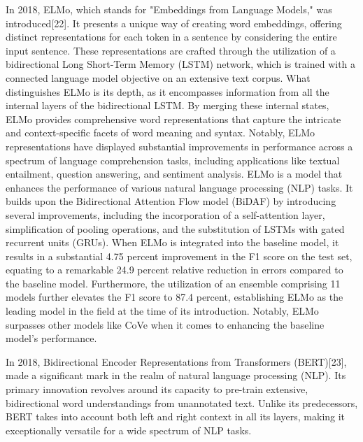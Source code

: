 \documentclass[fleqn,10pt]{thescipub} %
\begin{document}
In 2018, ELMo, which stands for "Embeddings from Language Models," was introduced[22]. It presents a unique way of creating word embeddings, offering distinct representations for each token in a sentence by considering the entire input sentence. These representations are crafted through the utilization of a bidirectional Long Short-Term Memory (LSTM) network, which is trained with a connected language model objective on an extensive text corpus. What distinguishes ELMo is its depth, as it encompasses information from all the internal layers of the bidirectional LSTM. By merging these internal states, ELMo provides comprehensive word representations that capture the intricate and context-specific facets of word meaning and syntax. Notably, ELMo representations have displayed substantial improvements in performance across a spectrum of language comprehension tasks, including applications like textual entailment, question answering, and sentiment analysis.
ELMo is a model that enhances the performance of various natural language processing (NLP) tasks. It builds upon the Bidirectional Attention Flow model (BiDAF) by introducing several improvements, including the incorporation of a self-attention layer, simplification of pooling operations, and the substitution of LSTMs with gated recurrent units (GRUs). When ELMo is integrated into the baseline model, it results in a substantial 4.75 percent improvement in the F1 score on the test set, equating to a remarkable 24.9 percent relative reduction in errors compared to the baseline model. Furthermore, the utilization of an ensemble comprising 11 models further elevates the F1 score to 87.4 percent, establishing ELMo as the leading model in the field at the time of its introduction. Notably, ELMo surpasses other models like CoVe when it comes to enhancing the baseline model's performance.

In 2018, Bidirectional Encoder Representations from Transformers (BERT)[23], made a significant mark in the realm of natural language processing (NLP). Its primary innovation revolves around its capacity to pre-train extensive, bidirectional word understandings from unannotated text. Unlike its predecessors, BERT takes into account both left and right context in all its layers, making it exceptionally versatile for a wide spectrum of NLP tasks.
\end{document}
